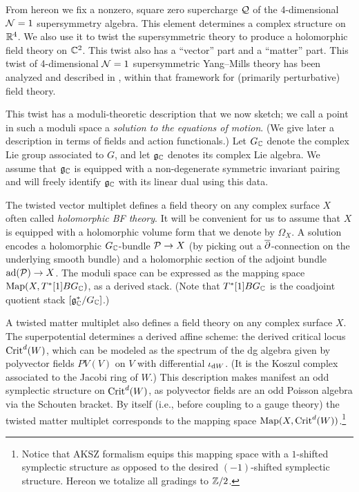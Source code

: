 \documentclass[11pt]{amsart}
\begin{document}
From hereon we fix a nonzero, square zero supercharge $\mathcal Q$ of the 4-dimensional $\mathcal N=1$ supersymmetry algebra.
This element determines a complex structure on $\mathbb R^4$.
We also use it to twist the supersymmetric theory to produce a holomorphic field theory on $\mathbb C^2$.
This twist also has a ``vector'' part and a ``matter'' part.
This twist of 4-dimensional $\mathcal N=1$ supersymmetric Yang--Mills theory has been analyzed and described in \cite{CosYangian, ESW, SWchar}, within that framework for (primarily perturbative) field theory.

This twist has a moduli-theoretic description that we now sketch;
we call a point in such a moduli space a {\it solution to the equations of motion}. 
(We give later a description in terms of fields and action functionals.)
Let $G_\mathbb C$ denote the complex Lie group associated to $G$,
and let $\mathfrak g_\mathbb C$ denotes its complex Lie algebra.
We assume that $\mathfrak g_\mathbb C$ is equipped with a non-degenerate symmetric invariant pairing and will freely identify $\mathfrak g_\mathbb C$ with its linear dual using this data.

The twisted vector multiplet defines a field theory on any complex surface $X$ often called {\em holomorphic BF theory}. 
It will be convenient for us to assume that $X$ is equipped with a holomorphic volume form that we denote by $\Omega_X$. 
A solution encodes a holomorphic $G_\mathbb C$-bundle $\mathcal P \to X$ (by picking out a ${\overline{\partial}}$-connection on the underlying smooth bundle) and a holomorphic section of the adjoint bundle $\mathrm{ad}(\mathcal P) \to X$.
The moduli space can be expressed as the mapping space ${\rm Map}(X, T^*[1]BG_{\mathbb C})$, as a derived stack.
(Note that $T^*[1]BG_{\mathbb C}$ is the coadjoint quotient stack $[\mathfrak g_\mathbb C^*/G_{\mathbb C}]$.)

\def\Sslash{\!\sslash\!}

A twisted matter multiplet also defines a field theory on any complex surface $X$. 
The superpotential determines a derived affine scheme: the derived critical locus ${\rm Crit}^d(W)$, which can be modeled as the spectrum of the dg algebra given by polyvector fields $PV(V)$ on $V$ with differential $\iota_{{\rm d} W}$.
(It is the Koszul complex associated to the Jacobi ring of $W$.)
This description makes manifest an odd symplectic structure on ${\rm Crit}^d(W)$,
as polyvector fields are an odd Poisson algebra via the Schouten bracket.
By itself (i.e., before coupling to a gauge theory) the twisted matter multiplet corresponds to the mapping space ${\rm Map}(X, {\rm Crit}^d(W))$.\footnote{Notice that AKSZ formalism equips this mapping space with a $1$-shifted symplectic structure as opposed to the desired $(-1)$-shifted symplectic structure.
Hereon we totalize all gradings to $\mathbb Z/2$.}
\end{document}
